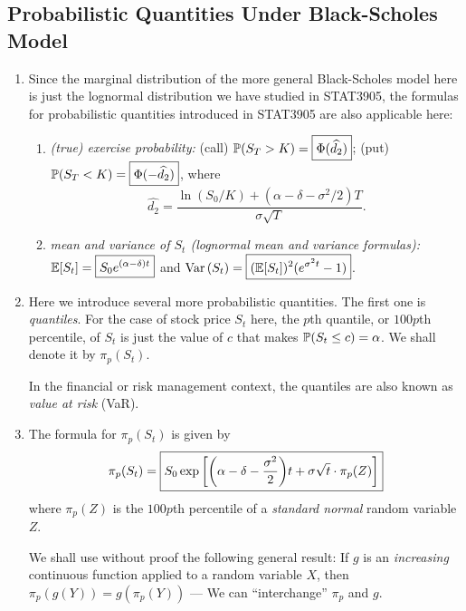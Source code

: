 \subsection{Probabilistic Quantities Under Black-Scholes Model}
\begin{enumerate}
\item Since the marginal distribution of the more general Black-Scholes model
here is just the lognormal distribution we have studied in STAT3905, the
formulas for probabilistic quantities introduced in STAT3905 are also
applicable here:
\begin{enumerate}
\item\label{it:bs-ex-prob} \emph{(true) exercise probability:} (call)
\(\mathbb{P}\qty(S_T>K)=\boxed{\Phi(\widehat{d_2})}\); (put)
\(\mathbb{P}\qty(S_T<K)=\boxed{\Phi(-\widehat{d_2})}\), where
\[
\widehat{d_2}=\frac{\ln(S_0/K)+(\alpha-\delta-\sigma^2/2)T}{\sigma\sqrt{T}}.
\]
\item \label{it:bs-mean-var-stock-price} \emph{mean and variance of \(S_t\)
(lognormal mean and variance formulas):}
\(\mathbb{E}\qty[S_t]=\boxed{S_0e^{(\alpha-\delta)t}}\) and
\(\operatorname{Var}\qty(S_t)=\boxed{(\mathbb{E}\qty[S_t])^{2}(e^{\sigma^{2} t}-1)}\).
\end{enumerate}

\item Here we introduce several more probabilistic quantities. The first one is
\emph{quantiles}. For the case of stock price \(S_t\) here, the \(p\)th
quantile, or \(100p\)th percentile, of \(S_t\) is just the value of \(c\) that
makes \(\mathbb{P}\qty(S_t\le c)=\alpha\). We shall denote it by
\(\pi_{p}(S_t)\).

\begin{note}
In the financial or risk management context, the quantiles are also known as
\emph{value at risk} (VaR).
\end{note}

\item \label{it:bs-stock-price-quantile-fmla} The formula for \(\pi_{p}(S_t)\)
is given by
\[
\pi_{p}(S_t)=\boxed{S_0\exp\qty[\qty(\alpha-\delta-\frac{\sigma^2}{2})t + \sigma\sqrt{t}\cdot \pi_{p}(Z)]}
\]
where \(\pi_{p}(Z)\) is the \(100p\)th percentile of a \emph{standard normal}
random variable \(Z\).

\begin{pf}
We shall use without proof the following general result: If \(g\) is an
\emph{increasing} continuous function applied to a random variable \(X\), then
\(\pi_{p}(g(Y))=g(\pi_{p}(Y))\) --- We can ``interchange'' \(\pi_{p}\) and
\(g\).


\end{pf}
\end{enumerate}
